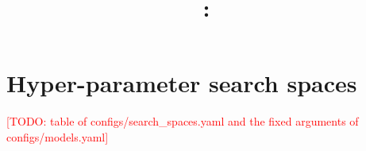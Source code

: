 \documentclass[10pt]{article}
\title{\ours{}: \todo{title}}
\author{\todo{authors}}
\date{}
\newcommand{\todo}[1]{\textcolor{red}{[TODO: #1]}}
\begin{document}
\maketitle




\appendix
\section{Hyper-parameter search spaces}
\label{app:hps}
\todo{table of configs/search\_spaces.yaml and the fixed arguments of configs/models.yaml}
\end{document}
